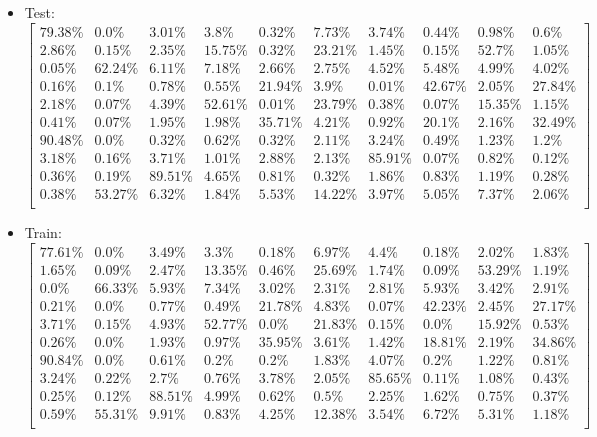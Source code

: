 \documentclass[a4paper,14pt]{report}
\begin{document}
	\begin{itemize}
		\item Test:
		$
		\begin{bmatrix}
		79.38\% & 0.0\% & 3.01\% & 3.8\% & 0.32\% & 7.73\% & 3.74\% & 0.44\% & 0.98\% & 0.6\% \\ 
		2.86\% & 0.15\% & 2.35\% & 15.75\% & 0.32\% & 23.21\% & 1.45\% & 0.15\% & 52.7\% & 1.05\% \\ 
		0.05\% & 62.24\% & 6.11\% & 7.18\% & 2.66\% & 2.75\% & 4.52\% & 5.48\% & 4.99\% & 4.02\% \\ 
		0.16\% & 0.1\% & 0.78\% & 0.55\% & 21.94\% & 3.9\% & 0.01\% & 42.67\% & 2.05\% & 27.84\% \\ 
		2.18\% & 0.07\% & 4.39\% & 52.61\% & 0.01\% & 23.79\% & 0.38\% & 0.07\% & 15.35\% & 1.15\% \\ 
		0.41\% & 0.07\% & 1.95\% & 1.98\% & 35.71\% & 4.21\% & 0.92\% & 20.1\% & 2.16\% & 32.49\% \\ 
		90.48\% & 0.0\% & 0.32\% & 0.62\% & 0.32\% & 2.11\% & 3.24\% & 0.49\% & 1.23\% & 1.2\% \\ 
		3.18\% & 0.16\% & 3.71\% & 1.01\% & 2.88\% & 2.13\% & 85.91\% & 0.07\% & 0.82\% & 0.12\% \\ 
		0.36\% & 0.19\% & 89.51\% & 4.65\% & 0.81\% & 0.32\% & 1.86\% & 0.83\% & 1.19\% & 0.28\% \\ 
		0.38\% & 53.27\% & 6.32\% & 1.84\% & 5.53\% & 14.22\% & 3.97\% & 5.05\% & 7.37\% & 2.06\% \\
		\end{bmatrix} 
		$
		\item Train:
		$
		\begin{bmatrix}
		77.61\% & 0.0\% & 3.49\% & 3.3\% & 0.18\% & 6.97\% & 4.4\% & 0.18\% & 2.02\% & 1.83\% \\ 
		1.65\% & 0.09\% & 2.47\% & 13.35\% & 0.46\% & 25.69\% & 1.74\% & 0.09\% & 53.29\% & 1.19\% \\ 
		0.0\% & 66.33\% & 5.93\% & 7.34\% & 3.02\% & 2.31\% & 2.81\% & 5.93\% & 3.42\% & 2.91\% \\ 
		0.21\% & 0.0\% & 0.77\% & 0.49\% & 21.78\% & 4.83\% & 0.07\% & 42.23\% & 2.45\% & 27.17\% \\ 
		3.71\% & 0.15\% & 4.93\% & 52.77\% & 0.0\% & 21.83\% & 0.15\% & 0.0\% & 15.92\% & 0.53\% \\ 
		0.26\% & 0.0\% & 1.93\% & 0.97\% & 35.95\% & 3.61\% & 1.42\% & 18.81\% & 2.19\% & 34.86\% \\ 
		90.84\% & 0.0\% & 0.61\% & 0.2\% & 0.2\% & 1.83\% & 4.07\% & 0.2\% & 1.22\% & 0.81\% \\ 
		3.24\% & 0.22\% & 2.7\% & 0.76\% & 3.78\% & 2.05\% & 85.65\% & 0.11\% & 1.08\% & 0.43\% \\ 
		0.25\% & 0.12\% & 88.51\% & 4.99\% & 0.62\% & 0.5\% & 2.25\% & 1.62\% & 0.75\% & 0.37\% \\ 
		0.59\% & 55.31\% & 9.91\% & 0.83\% & 4.25\% & 12.38\% & 3.54\% & 6.72\% & 5.31\% & 1.18\% \\
		\end{bmatrix} 
		$
	\end{itemize}
\end{document}
